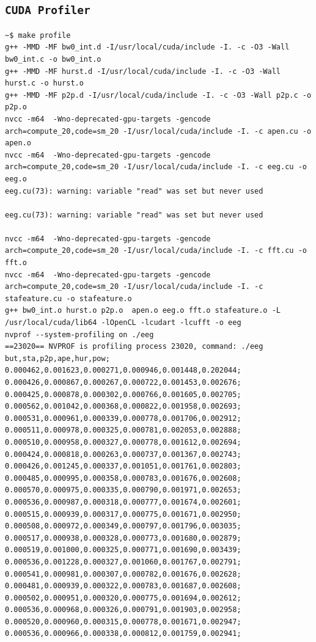 \documentclass[a4paper]{article}
\begin{document}
\subsection{\texttt{CUDA Profiler}}
\begin{lstlisting}
~$ make profile
g++ -MMD -MF bw0_int.d -I/usr/local/cuda/include -I. -c -O3 -Wall bw0_int.c -o bw0_int.o
g++ -MMD -MF hurst.d -I/usr/local/cuda/include -I. -c -O3 -Wall hurst.c -o hurst.o
g++ -MMD -MF p2p.d -I/usr/local/cuda/include -I. -c -O3 -Wall p2p.c -o p2p.o
nvcc -m64  -Wno-deprecated-gpu-targets -gencode arch=compute_20,code=sm_20 -I/usr/local/cuda/include -I. -c apen.cu -o apen.o
nvcc -m64  -Wno-deprecated-gpu-targets -gencode arch=compute_20,code=sm_20 -I/usr/local/cuda/include -I. -c eeg.cu -o eeg.o
eeg.cu(73): warning: variable "read" was set but never used

eeg.cu(73): warning: variable "read" was set but never used

nvcc -m64  -Wno-deprecated-gpu-targets -gencode arch=compute_20,code=sm_20 -I/usr/local/cuda/include -I. -c fft.cu -o fft.o
nvcc -m64  -Wno-deprecated-gpu-targets -gencode arch=compute_20,code=sm_20 -I/usr/local/cuda/include -I. -c stafeature.cu -o stafeature.o
g++ bw0_int.o hurst.o p2p.o  apen.o eeg.o fft.o stafeature.o -L /usr/local/cuda/lib64 -lOpenCL -lcudart -lcufft -o eeg
nvprof --system-profiling on ./eeg
==23020== NVPROF is profiling process 23020, command: ./eeg
but,sta,p2p,ape,hur,pow;
0.000462,0.001623,0.000271,0.000946,0.001448,0.202044;
0.000426,0.000867,0.000267,0.000722,0.001453,0.002676;
0.000425,0.000878,0.000302,0.000766,0.001605,0.002705;
0.000562,0.001042,0.000368,0.000822,0.001958,0.002693;
0.000531,0.000961,0.000339,0.000778,0.001706,0.002912;
0.000511,0.000978,0.000325,0.000781,0.002053,0.002888;
0.000510,0.000958,0.000327,0.000778,0.001612,0.002694;
0.000424,0.000818,0.000263,0.000737,0.001367,0.002743;
0.000426,0.001245,0.000337,0.001051,0.001761,0.002803;
0.000485,0.000995,0.000358,0.000783,0.001676,0.002608;
0.000570,0.000975,0.000335,0.000790,0.001971,0.002653;
0.000536,0.000987,0.000318,0.000777,0.001674,0.002601;
0.000515,0.000939,0.000317,0.000775,0.001671,0.002950;
0.000508,0.000972,0.000349,0.000797,0.001796,0.003035;
0.000517,0.000938,0.000328,0.000773,0.001680,0.002879;
0.000519,0.001000,0.000325,0.000771,0.001690,0.003439;
0.000536,0.001228,0.000327,0.001060,0.001767,0.002791;
0.000541,0.000981,0.000307,0.000782,0.001676,0.002628;
0.000481,0.000939,0.000322,0.000783,0.001687,0.002608;
0.000502,0.000951,0.000320,0.000775,0.001694,0.002612;
0.000536,0.000968,0.000326,0.000791,0.001903,0.002958;
0.000520,0.000960,0.000315,0.000778,0.001671,0.002947;
0.000536,0.000966,0.000338,0.000812,0.001759,0.002941;


\end{lstlisting}
\end{document}

